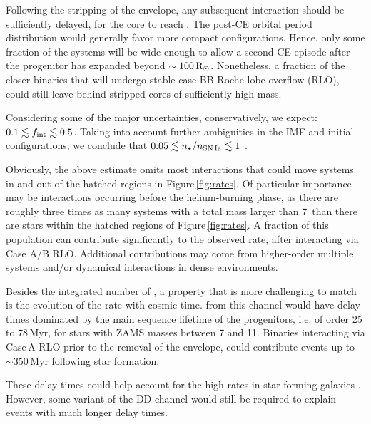 \documentclass[twocolumn,tighten,times]{aastex62}
\begin{document}
Following the stripping of the envelope, any 
subsequent interaction should be sufficiently delayed, for the core to reach \mch. The post-CE orbital period distribution would generally favor  more compact configurations. Hence, only some fraction of the systems will be wide enough to allow 
 a second CE episode after the progenitor has expanded beyond $\sim 100\mathrm{\,R_\odot}$. 
Nonetheless, a fraction of the closer binaries that will undergo stable case BB Roche-lobe 
overflow (RLO), could still leave behind stripped \one cores of sufficiently high mass.  

Considering some of the major uncertainties, conservatively, we expect: $0.1 \lesssim f_{\rm int}\lesssim 0.5$. 
Taking into account further ambiguities in the IMF and initial configurations, we conclude 
that $0.05\lesssim n_\star / n_{\rm SN\,Ia} \lesssim 1$ \citep[see also][]{Jones:2018ule}.

Obviously, the above estimate omits most interactions that could move systems in and out of the hatched regions in 
Figure\,\ref{fig:rates}. Of particular importance may be interactions 
occurring before the helium-burning phase, as there are  
roughly three times as many systems with a total mass larger than 7\msun\  
than there are stars within the hatched regions of Figure\,\ref{fig:rates}. 
A fraction of this population can contribute significantly to the observed rate, after interacting via Case A/B RLO. 
Additional contributions may come from higher-order multiple systems and/or dynamical interactions in dense environments.  


Besides the integrated number of \ias, a property that is more challenging to match is the evolution of the \ia rate with cosmic time. \ias from this channel would have delay times dominated by the main sequence lifetime of the progenitors, i.e. of order 25 to 78\,Myr, for stars with ZAMS masses between 7 and 11\msun. Binaries interacting via  Case\,A RLO prior to the removal of the envelope, could contribute events up to $\sim 350$\,Myr following star formation. 

These delay times could help account for the high \ia rates in star-forming galaxies \citep{Maoz:2010pz,claeys2014}. 
However, some variant of the DD channel would still be required to explain events with much longer delay times.  
\end{document}
